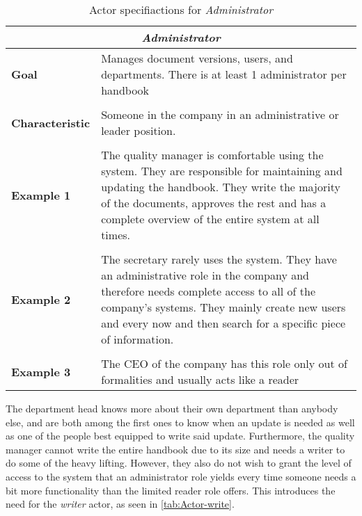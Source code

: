 \begin{table}[H]
	\begin{tabular}{l p{11.3cm}}
		\hline
		\multicolumn{2}{c}{\textbf{\textit{Administrator}}}\\
		\hline
		
		\textbf{Goal} &  Manages document versions, users, and departments. There is at least 1 administrator per handbook\\
		 &  \\
		 
		\textbf{Characteristic} & Someone in the company in an administrative or leader position.\\
		&  \\
		
		\textbf{Example 1}
		& The quality manager is comfortable using the system. 
		They are responsible for maintaining and updating the handbook.
		They write the majority of the documents, approves the rest and has a complete overview of the entire system at all times. \\
		&  \\
		
		\textbf{Example 2}
		& The secretary rarely uses the system.
		They have an administrative role in the company and therefore needs complete access to all of the company's systems.
		They mainly create new users and every now and then search for a specific piece of information.\\
		&  \\
		
		\textbf{Example 3}
		& The CEO of the company has this role only out of formalities and usually acts like a reader\\
		
		\hline
	\end{tabular}
\caption{Actor specifiactions for \textit{Administrator}}\label{tab:Actor-admin}
\end{table}

The department head knows more about their own department than anybody else, and are both among the first ones to know when an update is needed as well as one of the people best equipped to write said update.
Furthermore, the quality manager cannot write the entire handbook due to its size and needs a writer to do some of the heavy lifting.
However, they also do not wish to grant the level of access to the system that an administrator role yields every time someone needs a bit more functionality than the limited reader role offers.
This introduces the need for the \textit{writer} actor, as seen in \cref{tab:Actor-write}.

